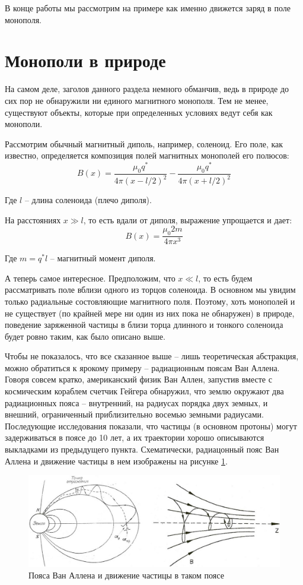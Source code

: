 \documentclass[a4paper, 12pt]{article}
\begin{document}
В конце работы мы рассмотрим на примере как именно движется заряд в поле монополя.

\section{Монополи в природе}
На самом деле, заголов данного раздела немного обманчив, ведь в природе до сих пор не обнаружили ни единого магнитного монополя. Тем не менее, существуют объекты, которые при определенных условиях ведут себя как монополи. 

Рассмотрим обычный магнитный диполь, например, соленоид. Его поле, как известно, определяется композиция полей магнитных монополей его полюсов:
\[
    B(x) = \frac{\mu_0q^*}{4\pi\left(x - l/2\right)^2} - \frac{\mu_0q^*}{4\pi\left(x + l/2\right)^2}  
\]

Где $l$ -- длина соленоида (плечо диполя).

На расстояниях $x \gg l$, то есть вдали от диполя, выражение упрощается и дает:
\[
    B(x) = \frac{\mu_0 2m}{4\pi x^3}
\]

Где $m = q^*l$ -- магнитный момент диполя.

А теперь самое интересное. Предположим, что $x \ll l$, то есть будем рассматривать поле вблизи одного из торцов соленоида. В основном мы увидим только радиальные состовляющие магнитного поля. Поэтому, хоть монополей и не существует (по крайней мере ни один из них пока не обнаружен) в природе, поведение заряженной частицы в близи торца длинного и тонкого соленоида будет ровно таким, как было описано выше.

Чтобы не показалось, что все сказанное выше -- лишь теоретическая абстракция, можно обратиться к ярокому примеру -- радиационным поясам Ван Аллена. Говоря совсем кратко, американский физик Ван Аллен, запустив вместе с космическим кораблем счетчик Гейгера обнаружил, что землю окружают два радиационных пояса -- внутренний, на радиусах порядка двух земных, и внешний, ограниченный приблизительно восемью земными радиусами. Последующие исследования показали, что частицы (в основном протоны) могут задерживаться в поясе до 10 лет, а их траектории хорошо описываются выкладками из предыдущего пункта. Схематически, радиацонный пояс Ван Аллена и движение частицы в нем изображены на рисунке \ref{fig:van_allen_belt}.

\begin{figure}[h]
    \includegraphics[width=\linewidth]{van_allen_belts.jpg}
    \centering
    \caption{Пояса Ван Аллена и движение частицы в таком поясе}
    \label{fig:van_allen_belt}
\end{figure}
\end{document}
